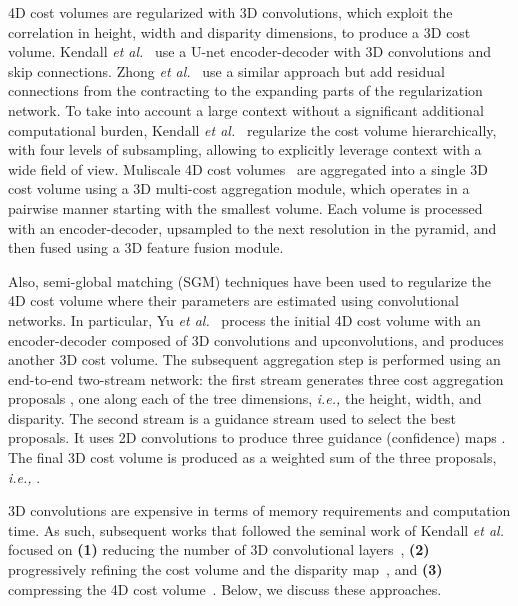 \documentclass[10pt,journal,compsoc]{IEEEtran}
\newcommand{\ie}{\emph{i.e., }}
\newcommand{\etal}{\emph{et al.}}
\begin{document}
4D cost volumes are regularized with 3D convolutions, which exploit the correlation in height, width and disparity dimensions, to produce a 3D cost volume.  Kendall \etal~\cite{kendall2017end} use  a U-net encoder-decoder with 3D convolutions and skip connections. Zhong \etal~\cite{zhong2017self}  use a similar approach but add  residual connections from the contracting to the expanding parts of the regularization network. To   take into account a large context without a significant additional computational burden, Kendall \etal~\cite{kendall2017end} regularize the cost volume hierarchically, with four levels of subsampling, allowing to explicitly leverage context with a wide field of view.   Muliscale 4D cost volumes~\cite{Wu_2019_ICCV}  are aggregated into a single 3D cost volume using a 3D multi-cost aggregation module, which operates in a pairwise manner  starting with the smallest volume. Each volume is  processed with an encoder-decoder, upsampled to the next resolution in the pyramid, and  then fused using a 3D feature fusion module.


Also, semi-global matching (SGM) techniques  have been used to regularize the 4D cost volume where their parameters are estimated using convolutional networks. In particular, Yu \etal~\cite{yu2018deep} process the initial 4D cost volume with an encoder-decoder composed of 3D convolutions and upconvolutions, and produces another 3D cost volume. The subsequent aggregation step is performed using an end-to-end two-stream network:  the first stream generates three cost aggregation proposals , one along each of the tree dimensions, \ie the height, width, and disparity.  The second stream is a guidance stream used to select the best proposals.  It uses 2D convolutions to produce three guidance (confidence) maps .  The final 3D cost volume is  produced as a weighted sum of the three proposals, \ie . 



3D convolutions are expensive in terms of memory requirements and computation time. As such, subsequent works that followed the seminal work of Kendall \etal~\cite{kendall2017end} focused on \textbf{(1)} reducing the number of 3D convolutional layers~\cite{zhang2019ga}, \textbf{(2)} progressively refining the cost volume and the disparity map~\cite{chang2018pyramid,wang2019anytime}, and \textbf{(3)} compressing the 4D cost volume~\cite{tulyakov2018practical}. Below, we discuss these approaches. 
\end{document}
